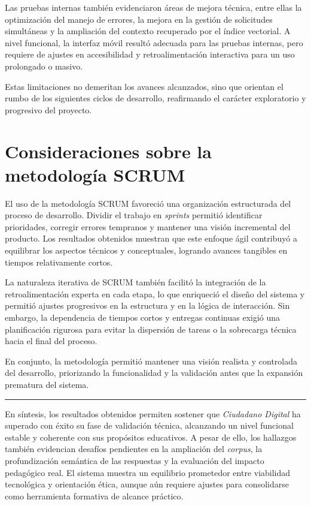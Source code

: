 Las pruebas internas también evidenciaron áreas de mejora técnica, entre ellas
la optimización del manejo de errores, la mejora en la gestión de solicitudes
simultáneas y la ampliación del contexto recuperado por el índice vectorial. A
nivel funcional, la interfaz móvil resultó adecuada para las pruebas internas,
pero requiere de ajustes en accesibilidad y retroalimentación interactiva para
un uso prolongado o masivo.

Estas limitaciones no demeritan los avances alcanzados, sino que orientan el
rumbo de los siguientes ciclos de desarrollo, reafirmando el carácter
exploratorio y progresivo del proyecto.

\section{Consideraciones sobre la metodología SCRUM}
El uso de la metodología SCRUM favoreció una organización estructurada del
proceso de desarrollo. Dividir el trabajo en \textit{sprints} permitió
identificar prioridades, corregir errores tempranos y mantener una visión
incremental del producto. Los resultados obtenidos muestran que este enfoque
ágil contribuyó a equilibrar los aspectos técnicos y conceptuales, logrando
avances tangibles en tiempos relativamente cortos.

La naturaleza iterativa de SCRUM también facilitó la integración de la
retroalimentación experta en cada etapa, lo que enriqueció el diseño del
sistema y permitió ajustes progresivos en la estructura y en la lógica de
interacción. Sin embargo, la dependencia de tiempos cortos y entregas continuas
exigió una planificación rigurosa para evitar la dispersión de tareas o la
sobrecarga técnica hacia el final del proceso.

En conjunto, la metodología permitió mantener una visión realista y controlada
del desarrollo, priorizando la funcionalidad y la validación antes que la
expansión prematura del sistema.


\noindent\rule{\linewidth}{0.5pt}

En síntesis, los resultados obtenidos permiten sostener que \textit{Ciudadano
    Digital} ha superado con éxito su fase de validación técnica, alcanzando un
nivel funcional estable y coherente con sus propósitos educativos. A pesar de
ello, los hallazgos también evidencian desafíos pendientes en la ampliación del
\textit{corpus}, la profundización semántica de las respuestas y la evaluación
del impacto pedagógico real. El sistema muestra un equilibrio prometedor entre
viabilidad tecnológica y orientación ética, aunque aún requiere ajustes para
consolidarse como herramienta formativa de alcance práctico.